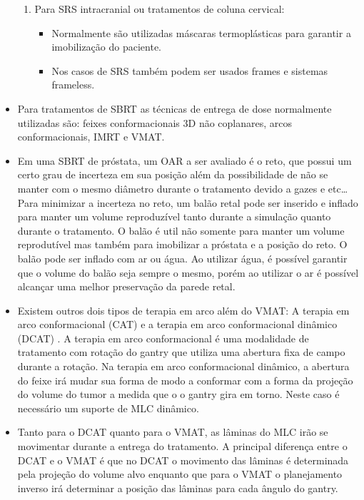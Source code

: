\documentclass[11pt,a4paper]{article}
\newcounter{exemplo}
\begin{document}
\begin{exemplo}
\begin{itemize}
\begin{enumerate}[label=\textcolor{CarnationPink}{\alph*)}]
                \item Para SRS intracranial ou tratamentos de coluna cervical:
                    \begin{itemize}[label=\textcolor{CarnationPink}{$\blacktriangleright$}]
                        \item Normalmente são utilizadas máscaras termoplásticas para garantir a imobilização do paciente.
                        \item Nos casos de SRS também podem ser usados frames e sistemas frameless.
                    \end{itemize}
            \end{enumerate}

        \item Para tratamentos de SBRT as técnicas de entrega de dose normalmente utilizadas são: feixes conformacionais 3D não coplanares, arcos conformacionais, IMRT e VMAT.

        \item Em uma SBRT de próstata, um OAR a ser avaliado é o reto, que possui um certo grau de incerteza em sua posição além da possibilidade de não se manter com o mesmo diâmetro durante o tratamento devido a gazes e etc\dots Para minimizar a incerteza no reto, um balão retal pode ser inserido e inflado para manter um volume reproduzível tanto durante a simulação quanto durante o tratamento. O balão é util não somente para manter um volume reprodutível mas também para imobilizar a próstata e a posição do reto. O balão pode ser inflado com ar ou água. Ao utilizar água, é possível garantir que o volume do balão seja sempre o mesmo, porém ao utilizar o ar é possível alcançar uma melhor preservação da parede retal. 

        \item Existem outros dois tipos de terapia em arco além do VMAT: A terapia em arco conformacional (CAT) e a terapia em arco conformacional dinâmico (DCAT) . A terapia em arco conformacional é uma modalidade de tratamento com rotação do gantry que utiliza uma abertura fixa de campo durante a rotação. Na terapia em arco conformacional dinâmico, a abertura do feixe irá mudar sua forma de modo a conformar com a forma da projeção do volume do tumor a medida que o o gantry gira em torno. Neste caso é necessário um suporte de MLC dinâmico. 

        \item Tanto para o DCAT quanto para o VMAT, as lâminas do MLC irão se movimentar durante a entrega do tratamento. A principal diferença entre o DCAT e o VMAT é que no DCAT o movimento das lâminas é determinada pela projeção do volume alvo enquanto que para o VMAT o planejamento inverso irá determinar a posição das lâminas para cada ângulo do gantry.
        

\end{itemize}
\end{exemplo}
\end{document}
